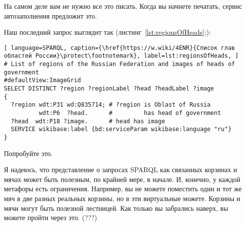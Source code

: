 На самом деле вам не нужно все это писать. Когда вы начнете печатать, сервис автозаполнения предложит это.

Наш последний запрос выглядит так (листинг~\ref{lst:regionsOfHeads};): 

\begin{lstlisting}[ language=SPARQL, caption={\href{https://w.wiki/4ENR}{Список глав областей России}\protect\footnotemark}, label=lst:regionsOfHeads, ]
# List of regions of the Russian Federation and images of heads of government
#defaultView:ImageGrid
SELECT DISTINCT ?region ?regionLabel ?head ?headLabel ?image
{
  ?region wdt:P31 wd:Q835714; # ?region is Oblast of Russia
          wdt:P6  ?head.      #         has head of government
  ?head  wdt:P18 ?image.      # head has image
  SERVICE wikibase:label {bd:serviceParam wikibase:language "ru"} 
}
\end{lstlisting}

Попробуйте это.

Я надеюсь, что представление о запросах SPARQL как связанных корзинах и мячах может быть полезным, по крайней мере, в начале. И, конечно, у каждой метафоры есть ограничения. Например, вы не можете поместить один и тот же мяч в две разных реальных корзины, но в эти виртуальные можете. Корзины и мячи могут быть полезной лестницей. Как только вы забрались наверх, вы можете пройти через это. (???)